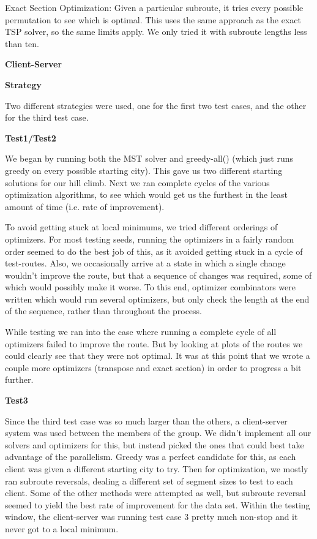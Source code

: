\documentclass[letterpaper,10pt,titlepage,fleqn]{article}
\begin{document}
Exact Section Optimization: Given a particular subroute, it tries every possible permutation to see which is optimal. This uses the same approach as the exact TSP solver, so the same limits apply. We only tried it with subroute lengths less than ten. \\

\begin{Large}
\textbf{Client-Server}\\
\end{Large}


\begin{Large}
\textbf{Strategy} \\
\end{Large}

Two different strategies were used, one for the first two test cases, and the other for the third test case.

\textbf{Test1/Test2}

We began by running both the MST solver and greedy-all() (which just runs greedy on every possible starting city). This gave us two different starting solutions for our hill climb. Next we ran complete cycles of the various optimization algorithms, to see which would get us the furthest in the least amount of time (i.e. rate of improvement). 

To avoid getting stuck at local minimums, we tried different orderings of optimizers. For most testing seeds, running the optimizers in a fairly random order seemed to do the best job of this, as it avoided getting stuck in a cycle of test-routes. Also, we occasionally arrive at a state in which a single change wouldn’t improve the route, but that a sequence of changes was required, some of which would possibly make it worse. To this end, optimizer combinators were written which would run several optimizers, but only check the length at the end of the sequence, rather than throughout the process.

While testing we ran into the case where running a complete cycle of all optimizers failed to improve the route. But by looking at plots of the routes we could clearly see that they were not optimal. It was at this point that we wrote a couple more optimizers (transpose and exact section) in order to progress a bit further.

\textbf{Test3}

Since the third test case was so much larger than the others, a client-server system was used between the members of the group. We didn’t implement all our solvers and optimizers for this, but instead picked the ones that could best take advantage of the parallelism. Greedy was a perfect candidate for this, as each client was given a different starting city to try. Then for optimization, we mostly ran subroute reversals, dealing a different set of segment sizes to test to each client. Some of the other methods were attempted as well, but subroute reversal seemed to yield the best rate of improvement for the data set. Within the testing window, the client-server was running test case 3 pretty much non-stop and it never got to a local minimum. \\
\end{document}
